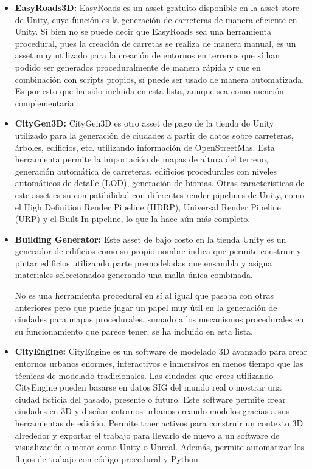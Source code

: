             \begin{itemize}[label=\textbullet]
                \item \textbf{EasyRoads3D: }
                EasyRoads es un asset gratuito disponible en la asset store de Unity, cuya función es la generación de carreteras de manera eficiente en Unity. Si bien no se puede decir que EasyRoads sea una herramienta procedural, pues la creación de carretas se realiza de manera manual, es un asset muy utilizado para la creación de entornos en terrenos que sí han podido ser generados proceduralmente de manera rápida y que en combinación con scripts propios, sí puede ser usado de manera automatizada. Es por esto que ha sido incluida en esta lista, aunque sea como mención complementaria. \cite{easyroads3d}
                
                \item \textbf{CityGen3D:}
                CityGen3D es otro asset de pago de la tienda de Unity utilizado para la generación de ciudades a partir de datos sobre carreteras, árboles, edificios, etc. utilizando información de OpenStreetMas. Esta herramienta permite la importación de mapas de altura del terreno, generación automática de carreteras, edificios procedurales con niveles automáticos de detalle (LOD), generación de biomas. Otras características de este asset es su compatibilidad con diferentes render pipelines de Unity, como el High Definition Render Pipeline (HDRP), Universal Render Pipeline (URP) y el Built-In pipeline, lo que la hace aún más completo. \cite{CityGen3DUnityAssetStore} \cite{CityGen3DWebsite}
                
                \item \textbf{Building Generator:}
                Este asset de bajo costo en la tienda Unity es un generador de edificios como su propio nombre indica que permite construir y pintar edificios utilizando parte premodeladas que ensambla y asigna materiales seleccionados generando una malla única combinada. \cite{BuildingGenerator}

                No es una herramienta procedural en sí al igual que pasaba con otras anteriores pero que puede jugar un papel muy útil en la generación de ciudades para mapas procedurales, sumado a los mecanismos procedurales en su funcionamiento que parece tener, se ha incluido en esta lista.
                
                \item \textbf{CityEngine: }
                CityEngine es un software de modelado 3D avanzado para crear entornos urbanos enormes, interactivos e inmersivos en menos tiempo que las técnicas de modelado tradicionales. Las ciudades que crees utilizando CityEngine pueden basarse en datos SIG del mundo real o mostrar una ciudad ficticia del pasado, presente o futuro. Este software permite crear ciudades en 3D y diseñar entornos urbanos creando modelos gracias a sus herramientas de edición. Permite traer activos para construir un contexto 3D alrededor y exportar el trabajo para llevarlo de nuevo a un software de visualización o motor como Unity o Unreal. Además, permite automatizar los flujos de trabajo con código procedural y Python. \cite{EsriCityEngine} 
            \end{itemize}

